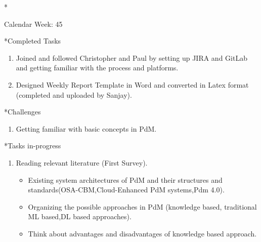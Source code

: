 \documentclass[11pt,a4paper]{article}
\begin{document}
\newpage
\begin{section}*{Calendar Week: 45 \hfill \date{06 November, 2020}}
 \begin{refsection}

       \begin{subsection}*{Completed Tasks}
             \begin{enumerate}
                   \item
                         Joined and followed Christopher and Paul by setting up JIRA and GitLab and getting familiar with the process and platforms.
                   \item
                        Designed Weekly Report Template in Word and converted in Latex format (completed and uploaded by Sanjay).
             \end{enumerate}
       \end{subsection}

       \begin{subsection}*{Challenges}
             \begin{enumerate}
                   \item
                         Getting familiar with basic concepts in PdM.
             \end{enumerate}
       \end{subsection}

       \begin{subsection}*{Tasks in-progress}
             \begin{enumerate}
                   \item
                        Reading relevant literature (First Survey)\cite{DBLP:journals/corr/abs-1912-07383}.
                        \begin{itemize}
                            \item Existing  system architectures of PdM and their structures and standards(OSA-CBM,Cloud-Enhanced PdM systems,Pdm 4.0).
                            \item Organizing the possible approaches in PdM (knowledge based, traditional ML based,DL based approaches).
                            \item Think about advantages and disadvantages 
                             of knowledge based approach.
                        \end{itemize}
             \end{enumerate}
       \end{subsection}

       \printbibliography
 \end{refsection}
\end{section}
\end{document}

